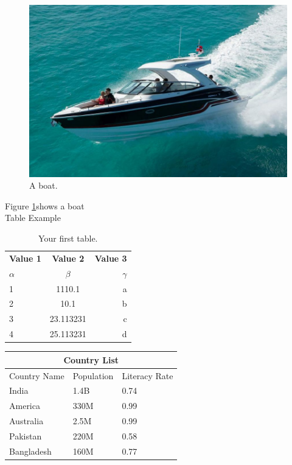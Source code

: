 \documentclass{article}
\begin{document}
\begin{figure}

\includegraphics[width=\linewidth]{boat.jpg}

\caption{A boat.}

\label{fig:boatI}

\end{figure}

Figure \ref{fig:boatI}shows a boat\\

Table Example

\begin{table}[h!]
\begin{center}
\caption{Your first table.}
\label{tab:table1}
\begin{tabular}{l|c|r}

\textbf{Value 1} & \textbf{Value 2} & \textbf{Value 3} \\

$\alpha$ &$\beta$ & $\gamma$\\
\hline
1 & 1110.1 & a\\
2 & 10.1 & b\\
3 & 23.113231 & c\\
4 & 25.113231 & d\\ %

\end{tabular}
\end{center}

\end{table}

\begin{tabular}{ ||p{3cm}||p{3cm}||p{3cm}||  }
 \hline
 \multicolumn{3}{|c|}{Country List} \\
 \hline
 Country Name&Population&Literacy Rate\\
 \hline
 India   &  1.4B   &0.74\\
 America&   330M  & 0.99\\
 Australia &2.5M & 0.99\\
 Pakistan    &220M & 0.58\\
 Bangladesh& 160M  & 0.77\\
 \hline
\end{tabular}
\end{document}
